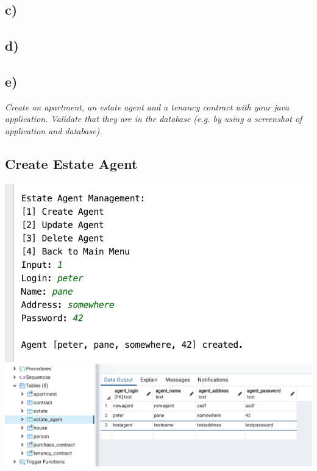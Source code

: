 \documentclass[ngerman]{dis-template-add}
\begin{document}
\subsection*{c)}

\subsection*{d)}

\subsection*{e)}

\textit{Create an apartment, an estate agent and a tenancy contract with your java application. Validate that they are in the database (e.g. by using a screenshot of application and database).}

\subsection*{Create Estate Agent}
\includegraphics[scale=.5]{agent_app} \\
\includegraphics[scale=.5]{agent_db}
\end{document}
